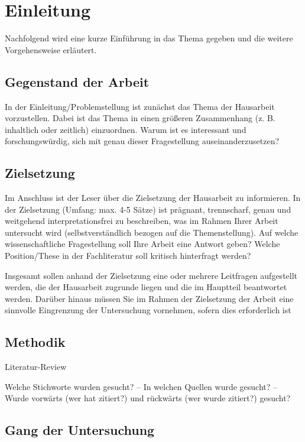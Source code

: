 \chapter{Einleitung}

Nachfolgend wird eine kurze Einführung in das Thema gegeben und die weitere Vorgehensweise erläutert.

\section{Gegenstand der Arbeit}

In der Einleitung/Problemstellung ist zunächst das Thema der Hausarbeit vorzustellen. Dabei ist das Thema in einen größeren Zusammenhang (z. B. inhaltlich oder zeitlich) einzuordnen. Warum ist es interessant und forschungswürdig, sich mit genau dieser Fragestellung auseinanderzusetzen?



\section{Zielsetzung}

Im Anschluss ist der Leser über die Zielsetzung der Hausarbeit zu informieren. In der Zielsetzung (Umfang: max. 4-5 Sätze) ist prägnant, trennscharf, genau und weitgehend interpretationsfrei zu beschreiben, was im Rahmen Ihrer Arbeit untersucht wird (selbstverständlich bezogen auf die Themenstellung).
Auf welche wissenschaftliche Fragestellung soll Ihre Arbeit eine Antwort geben? Welche Position/These in der Fachliteratur soll kritisch hinterfragt werden?

Insgesamt sollen anhand der Zielsetzung eine oder mehrere Leitfragen aufgestellt werden, die der Hausarbeit zugrunde liegen und die im Hauptteil beantwortet werden.
Darüber hinaus müssen Sie im Rahmen der Zielsetzung der Arbeit eine sinnvolle Eingrenzung der Untersuchung vornehmen, sofern dies erforderlich ist

\section{Methodik}

Literatur-Review

 Welche Stichworte wurden gesucht?
– In welchen Quellen wurde gesucht?
– Wurde vorwärts (wer hat zitiert?) und rückwärts (wer wurde zitiert?) gesucht?

\section{Gang der Untersuchung}

